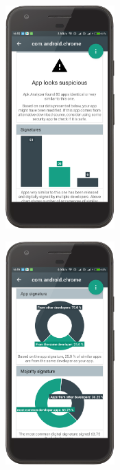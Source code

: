 \begin{minipage}[H] {\textwidth}
\begin{minipage}[t][][b]{0.45\textwidth}
\centering
    \includegraphics[width=4.2cm]{images/app/detection_device_1.png}
\centering
{}
\label{fig:detection-1}
\end{minipage}%
\hfill
\centering
\begin{minipage}[t][][b]{0.45\textwidth}
\centering
    \includegraphics[width=4.2cm]{images/app/detection_device_2.png}
\centering
{}
\label{fig:detection-2}
\end{minipage}%
\end{minipage}

	
	
